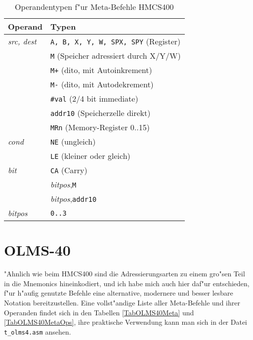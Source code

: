 \documentclass[12pt,a4paper,twoside]{report}
\newcommand{\tty}[1]{{\tt #1}}
\begin{document}
{\begin{table*}
\begin{center}\begin{tabular}{|l|l|}
\hline
Operand                 & Typen \\
\hline
{\em src, dest}         & \tty{A, B, X, Y, W, SPX, SPY} (Register) \\
                        & \tty{M} (Speicher adressiert durch X/Y/W) \\
                        & \tty{M+} (dito, mit Autoinkrement) \\
                        & \tty{M-} (dito, mit Autodekrement) \\
                        & \tty{\#val} (2/4 bit immediate) \\
                        & \tty{addr10} (Speicherzelle direkt) \\
                        & \tty{MRn} (Memory-Register 0..15) \\
{\em cond}              & \tty{NE} (ungleich) \\
                        & \tty{LE} (kleiner oder gleich) \\
{\em bit}               & \tty{CA} (Carry) \\
                        & {\em bitpos},\tty{M} \\
                        & {\em bitpos},\tty{addr10} \\
{\em bitpos}            & \tty{0..3} \\
\hline
\end{tabular}\end{center}
\caption{Operandentypen f"ur Meta-Befehle HMCS400}
\label{TabHMCS400MetaOps}
\end{table*}


\section{OLMS-40}

"Ahnlich wie beim HMCS400 sind die Adressierungsarten zu einem
gro"sen Teil in die Mnemonics hineinkodiert, und ich habe mich
auch hier daf"ur entschieden, f"ur h"aufig genutzte Befehle eine
alternative, modernere und besser lesbare Notation
bereitzustellen. 
Eine vollst"andige Liste aller Meta-Befehle und ihrer Operanden
findet sich in den Tabellen \ref{TabOLMS40Meta} und 
\ref{TabOLMS40MetaOps}, ihre praktische Verwendung kann man sich
in der Datei \tty{t\_olms4.asm} ansehen.

}
\end{document}
